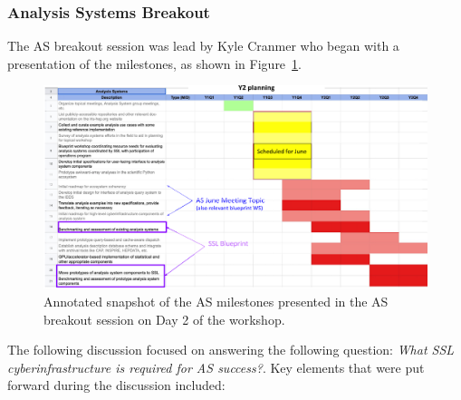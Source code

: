 \documentclass[11pt,letterpaper,fleqn]{article}
\begin{document}
\subsubsection{Analysis Systems Breakout}
\vspace{0.2cm}
The AS breakout session was lead by Kyle Cranmer who began with a presentation of the milestones, as shown in Figure~\ref{fig:AS_milestones}.
\begin{figure}
  \includegraphics[width=\linewidth]{figures/as_milestones.png}
  \caption{Annotated snapshot of the AS milestones presented in the AS breakout session on Day 2 of the workshop.}
  \label{fig:AS_milestones}
\end{figure}
The following discussion focused on answering the following question: {\it What SSL cyberinfrastructure is required for AS success?}. Key elements that were put forward during the discussion included:
\end{document}
